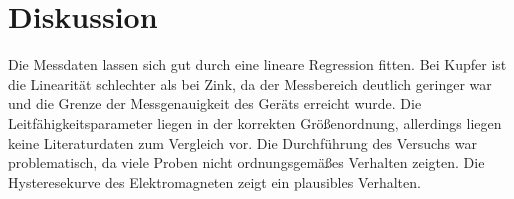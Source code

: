 \section{Diskussion}
\label{sec:Diskussion}

Die Messdaten lassen sich gut durch eine lineare Regression fitten. Bei Kupfer ist die Linearität schlechter als bei Zink, da der Messbereich deutlich geringer war und die Grenze der Messgenauigkeit des Geräts erreicht wurde. Die Leitfähigkeitsparameter liegen in der korrekten Größenordnung, allerdings liegen keine Literaturdaten zum Vergleich vor. Die Durchführung des Versuchs war problematisch, da viele Proben nicht ordnungsgemäßes Verhalten zeigten. Die Hysteresekurve des Elektromagneten zeigt ein plausibles Verhalten.
